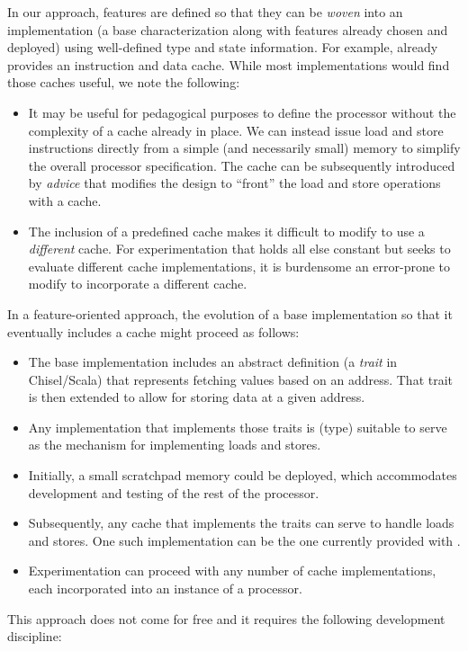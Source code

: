 \documentclass[conference]{IEEEtran}
\begin{document}
In our approach, features are defined so that they can be \emph{woven} into an implementation (a base characterization along with features already chosen and deployed) using well-defined type and state information.  For example, \Riscvmini{} already provides an instruction and data cache.  While most implementations would find those caches useful, we note the following:
\begin{itemize}
    \item It may be useful for pedagogical purposes to define the processor without the complexity of a cache already in place.  We can instead issue load and store instructions directly from a simple (and necessarily small) memory to simplify the overall processor specification.  The cache can be subsequently introduced by \emph{advice} that modifies the design to ``front'' the load and store operations with a cache.
    \item The inclusion of a predefined cache makes it difficult to modify \Riscvmini{} to use a \emph{different} cache.  For experimentation that holds all else constant but seeks to evaluate different cache implementations, it is burdensome an error-prone to modify \Riscvmini{} to incorporate a different cache. 
\end{itemize}
In a feature-oriented approach, the evolution of a base implementation so that it eventually includes a cache might proceed as follows:
\begin{itemize}
    \item The base implementation includes an abstract definition (a \emph{trait} in Chisel/Scala) that represents fetching values based on an address.  That trait is then extended to allow for storing data at a given address.  
    \item Any implementation that implements those traits is (type) suitable to serve as the mechanism for implementing loads and stores.
    \item Initially, a small scratchpad memory could be deployed, which accommodates development and testing of the rest of the processor.
    \item Subsequently, any cache that implements the traits can serve to handle loads and stores.  One such implementation can be the one currently provided with \Riscvmini{}.
    \item Experimentation can proceed with any number of cache implementations, each incorporated into an instance of a \Riscvmini{} processor.
\end{itemize}
This approach does not come for free and it requires the following development discipline:
\end{document}
